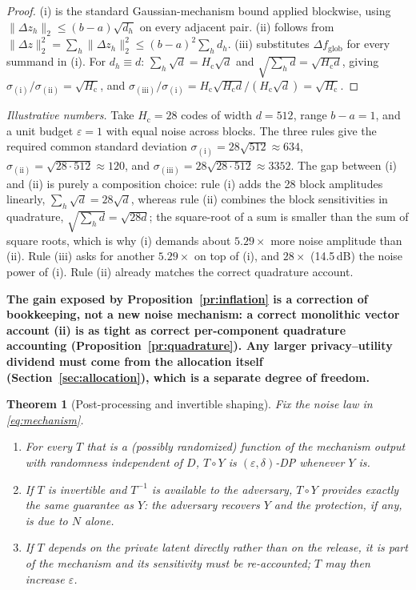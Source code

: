 \documentclass{ieeetj}
\theoremstyle{plain}
\newtheorem{theorem}{Theorem}
\theoremstyle{definition}
\begin{document}
\begin{proof}
(i) is the standard Gaussian-mechanism bound applied blockwise, using
$\|\Delta z_h\|_2\le(b-a)\sqrt{d_h}$ on every adjacent pair.
(ii) follows from $\|\Delta z\|_2^2=\sum_h\|\Delta z_h\|_2^2
\le(b-a)^2\sum_h d_h$. (iii) substitutes $\Delta f_{\mathrm{glob}}$ for every
summand in (i). For $d_h\equiv d$:
$\sum_h\sqrt d=H_{\mathrm c}\sqrt d$ and
$\sqrt{\sum_h d}=\sqrt{H_{\mathrm c}d}$, giving
$\sigma_{\mathrm{(i)}}/\sigma_{\mathrm{(ii)}}=\sqrt{H_{\mathrm c}}$, and
$\sigma_{\mathrm{(iii)}}/\sigma_{\mathrm{(i)}}=
H_{\mathrm c}\sqrt{H_{\mathrm c}d}/(H_{\mathrm c}\sqrt d)=\sqrt{H_{\mathrm c}}$.
\end{proof}

\emph{Illustrative numbers.} Take $H_{\mathrm c}=28$ codes of width
$d=512$, range $b-a=1$, and a unit budget $\varepsilon=1$ with equal noise
across blocks. The three rules give the required common standard deviation
$\sigma_{\mathrm{(i)}}=28\sqrt{512}\approx634$,
$\sigma_{\mathrm{(ii)}}=\sqrt{28\cdot512}\approx120$, and
$\sigma_{\mathrm{(iii)}}=28\sqrt{28\cdot512}\approx3352$. The gap between
(i) and (ii) is purely a composition choice: rule (i) adds the 28 block
amplitudes linearly, $\sum_h\sqrt d=28\sqrt d$, whereas rule (ii) combines the
block sensitivities in quadrature, $\sqrt{\sum_h d}=\sqrt{28d}$; the square-root
of a sum is smaller than the sum of square roots, which is why (i) demands about
$5.29\times$ more noise amplitude than (ii). Rule (iii) asks for another
$5.29\times$ on top of (i), and $28\times$ (14.5\,dB) the noise power of (i).
Rule (ii) already matches the correct quadrature account.

\textbf{The gain exposed by Proposition~\ref{pr:inflation} is a correction of
bookkeeping, not a new noise mechanism: a correct monolithic vector account
(ii) is as tight as correct per-component quadrature accounting
(Proposition~\ref{pr:quadrature}). Any larger privacy--utility dividend must
come from the allocation itself (Section~\ref{sec:allocation}), which is a
separate degree of freedom.}

\begin{theorem}[Post-processing and invertible shaping]
\label{th:postproc}
Fix the noise law in \eqref{eq:mechanism}.
\begin{enumerate}
\item[(i)] For every $T$ that is a (possibly randomized) function of the
mechanism output with randomness independent of $D$, $T\circ Y$ is
$(\varepsilon,\delta)$-DP whenever $Y$ is.
\item[(ii)] If $T$ is invertible and $T^{-1}$ is available to the adversary,
$T\circ Y$ provides exactly the same guarantee as $Y$: the adversary recovers
$Y$ and the protection, if any, is due to $N$ alone.
\item[(iii)] If $T$ depends on the private latent directly rather than on the
release, it is part of the mechanism and its sensitivity must be re-accounted;
$T$ may then \emph{increase} $\varepsilon$.
\end{enumerate}
\end{theorem}
\end{document}
